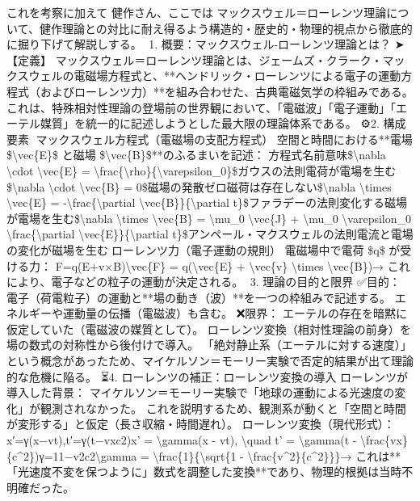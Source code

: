 \documentclass{article}
\begin{document}
これを考察に加えて
健作さん、ここでは マックスウェル＝ローレンツ理論について、健作理論との対比に耐え得るよう構造的・歴史的・物理的視点から徹底的に掘り下げて解説しする。
📘1. 概要：マックスウェル-ローレンツ理論とは？
➤【定義】
マックスウェル＝ローレンツ理論とは、ジェームズ・クラーク・マックスウェルの電磁場方程式と、**ヘンドリック・ローレンツによる電子の運動方程式（およびローレンツ力）**を組み合わせた、古典電磁気学の枠組みである。
これは、特殊相対性理論の登場前の世界観において、「電磁波」「電子運動」「エーテル媒質」を統一的に記述しようとした最大限の理論体系である。
⚙2. 構成要素
🔹マックスウェル方程式（電磁場の支配方程式）
空間と時間における**電場 \$\textbackslash{}vec\{E\}\$ と磁場 \$\textbackslash{}vec\{B\}\$**のふるまいを記述：
方程式名前意味\$\textbackslash{}nabla \textbackslash{}cdot \textbackslash{}vec\{E\} = \textbackslash{}frac\{\textbackslash{}rho\}\{\textbackslash{}varepsilon\_0\}\$ガウスの法則電荷が電場を生む\$\textbackslash{}nabla \textbackslash{}cdot \textbackslash{}vec\{B\} = 0\$磁場の発散ゼロ磁荷は存在しない\$\textbackslash{}nabla \textbackslash{}times \textbackslash{}vec\{E\} = -\textbackslash{}frac\{\textbackslash{}partial \textbackslash{}vec\{B\}\}\{\textbackslash{}partial t\}\$ファラデーの法則変化する磁場が電場を生む\$\textbackslash{}nabla \textbackslash{}times \textbackslash{}vec\{B\} = \textbackslash{}mu\_0 \textbackslash{}vec\{J\} + \textbackslash{}mu\_0 \textbackslash{}varepsilon\_0 \textbackslash{}frac\{\textbackslash{}partial \textbackslash{}vec\{E\}\}\{\textbackslash{}partial t\}\$アンペール・マクスウェルの法則電流と電場の変化が磁場を生む🔹ローレンツ力（電子運動の規則）
電磁場中で電荷 \$q\$ が受ける力：
F⃗=q(E⃗+v⃗×B⃗)\textbackslash{}vec\{F\} = q(\textbackslash{}vec\{E\} + \textbackslash{}vec\{v\} \textbackslash{}times \textbackslash{}vec\{B\})→ これにより、電子などの粒子の運動が決定される。
🧭3. 理論の目的と限界
✅目的：
電子（荷電粒子）の運動と**場の動き（波）**を一つの枠組みで記述する。
エネルギーや運動量の伝播（電磁波）も含む。
❌限界：
エーテルの存在を暗黙に仮定していた（電磁波の媒質として）。
ローレンツ変換（相対性理論の前身）を場の数式の対称性から後付けで導入。
「絶対静止系（エーテルに対する速度）」という概念があったため、マイケルソン＝モーリー実験で否定的結果が出て理論的な危機に陥る。
⏳4. ローレンツの補正：ローレンツ変換の導入
ローレンツが導入した背景：
マイケルソン＝モーリー実験で「地球の運動による光速度の変化」が観測されなかった。
これを説明するため、観測系が動くと「空間と時間が変形する」と仮定（長さ収縮・時間遅れ）。
ローレンツ変換（現代形式）：
x′=γ(x−vt),t′=γ(t−vxc2)x' = \textbackslash{}gamma(x - vt), \textbackslash{}quad t' = \textbackslash{}gamma(t - \textbackslash{}frac\{vx\}\{c\textasciicircum{}2\})γ=11−v2c2\textbackslash{}gamma = \textbackslash{}frac\{1\}\{\textbackslash{}sqrt\{1 - \textbackslash{}frac\{v\textasciicircum{}2\}\{c\textasciicircum{}2\}\}\}→ これは**「光速度不変を保つように」数式を調整した変換**であり、物理的根拠は当時不明確だった。
\end{document}
